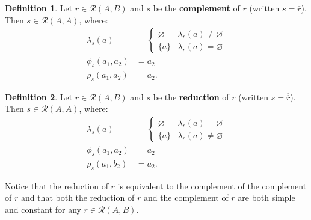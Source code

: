 \documentclass{article}
\theoremstyle{definition}
\newtheorem{definition}{Definition}[subsection]
\theoremstyle{plain}
\def\rule{\mathcal{R}}
\begin{document}
\begin{definition}
  Let $ r \in \rule (A, B) $
  and $ s $ be the \textbf{complement} of $ r $
  (written $ s = \overline{r} $).
  Then $ s \in \rule (A, A) $, where:
  \begin{align}
    \lambda_s (a)    & = \begin{cases}
                           \varnothing & \lambda_r (a) \neq \varnothing \\
                           \{ a \}     & \lambda_r (a) = \varnothing
                         \end{cases} \\
       \phi_s (a_1, a_2) & = a_2 \\
       \rho_s (a_1, a_2) & = a_2.
  \end{align}
\end{definition}

\begin{definition}
  Let $ r \in \rule (A, B) $
  and $ s $ be the \textbf{reduction} of $ r $ 
  (written $ s = \overline{\overline{r}} $).
  Then $ s \in \rule (A, A) $, where:
  \begin{align}
    \lambda_s (a)    & = \begin{cases}
                           \varnothing & \lambda_r (a) = \varnothing \\
                           \{ a \}     & \lambda_r (a) \neq \varnothing
                         \end{cases} \\
       \phi_s (a_1, a_2) & = a_2 \\
       \rho_s (a_1, b_2) & = a_2.
  \end{align}
\end{definition}

Notice that the reduction of $ r $ is equivalent to the complement of the complement of $ r $
and that both the reduction of $ r $ and the complement of $ r $ are both simple and constant for any $ r \in \rule (A, B) $.
\end{document}
